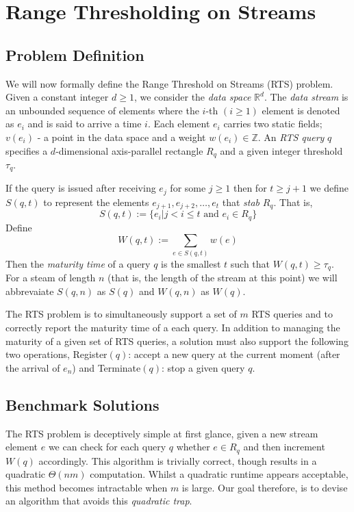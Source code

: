 \clearpage

\def\chaptertitle{Range Thresholding on Streams}

\lhead{\emph{\chaptertitle}}

\chapter{\chaptertitle}
\label{ch:rts}

\section{Problem Definition}
\label{sec:rts-definition}
We will now formally define the Range Threshold on Streams (RTS) problem. Given a constant integer $d\geq 1$, we consider the \textit{data space} $\mathbb{R}^d$. The \textit{data stream} is an unbounded sequence of elements where the $i$-th $(i\geq1)$ element is denoted as $e_i$ and is said to arrive a time $i$. Each element $e_i$ carries two static fields; $v(e_i)$ - a point in the data space and a weight $w(e_i)\in\mathbb{Z}$. An \textit{RTS query} $q$ specifies a $d$-dimensional axis-parallel rectangle $R_q$ and a given integer threshold $\tau_q$.

If the query is issued after receiving $e_j$ for some $j\geq 1$ then for $t\geq j+1$ we define $S(q,t)$ to represent the elements $e_{j+1},e_{j+2},\dots,e_t$ that \textit{stab} $R_q$. That is, 
$$S(q, t) := \{e_i | j < i \leq t \text{ and } e_i \in R_q\}$$
Define
$$W(q, t) := \sum_{e\in S(q,t)}w(e)$$
Then the \textit{maturity time} of a query $q$ is the smallest $t$ such that $W(q,t)\geq \tau_q$. For a steam of length $n$ (that is, the length of the stream at this point) we will abbrevaiate $S(q,n)$ as $S(q)$ and $W(q, n)$ as $W(q)$.

The RTS problem is to simultaneously support a set of $m$ RTS queries and to correctly report the maturity time of a each query. In addition to managing the maturity of a given set of RTS queries, a solution must also support the following two operations, Register$(q)$: accept a new query at the current moment (after the arrival of $e_n$) and Terminate$(q)$: stop a given query $q$.

\section{Benchmark Solutions}
\label{sec:benchmark-solutions}

The RTS problem is deceptively simple at first glance, given a new stream element $e$ we can check for each query $q$ whether $e \in R_q$ and then increment $W(q)$ accordingly. This algorithm is trivially correct, though results in a quadratic $\Theta(nm)$ computation. Whilst a quadratic runtime appears acceptable, this method becomes intractable when $m$ is large. Our goal therefore, is to devise an algorithm that avoids this \textit{quadratic trap}.

